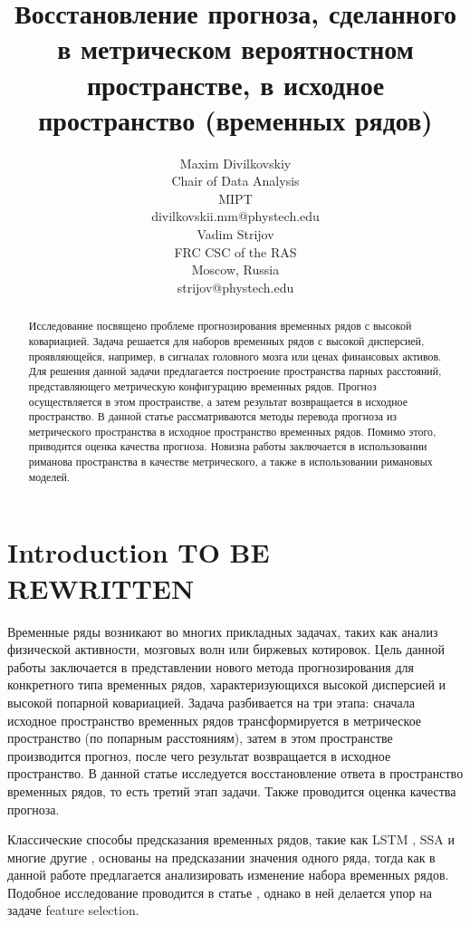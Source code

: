 \documentclass{article}
\title{Восстановление прогноза, сделанного в метрическом вероятностном пространстве, в исходное пространство (временных рядов)}
\author{ Maxim Divilkovskiy \\
	Chair of Data Analysis\\
	MIPT\\
	divilkovskii.mm@phystech.edu \\
	\And
	Vadim Strijov \\
	FRC CSC of the RAS\\
	Moscow, Russia\\
        strijov@phystech.edu \\
}
\date{}
\begin{document}
\maketitle

\begin{abstract}
	Исследование посвящено проблеме прогнозирования временных рядов с высокой ковариацией. Задача решается для наборов временных рядов с высокой дисперсией, проявляющейся, например, в сигналах головного мозга или ценах финансовых активов. Для решения данной задачи предлагается построение пространства парных расстояний, представляющего метрическую конфигурацию временных рядов. Прогноз осуществляется в этом пространстве, а затем результат возвращается в исходное пространство.
	В данной статье рассматриваются методы перевода прогноза из метрического пространства в исходное пространство временных рядов. Помимо этого, приводится оценка качества прогноза. Новизна работы заключается в использовании риманова пространства в качестве метрического, а также в использовании римановых моделей.


\end{abstract}



\section{Introduction TO BE REWRITTEN}
	Временные ряды возникают во многих прикладных задачах, таких как анализ физической активности, мозговых волн или биржевых котировок. Цель данной работы заключается в представлении нового метода прогнозирования для конкретного типа временных рядов, характеризующихся высокой дисперсией и высокой попарной ковариацией. Задача разбивается на три этапа: сначала исходное пространство временных рядов трансформируется в метрическое пространство (по попарным расстояниям), затем в этом пространстве производится прогноз, после чего результат возвращается в исходное пространство. В данной статье исследуется восстановление ответа в пространство временных рядов, то есть третий этап задачи. Также проводится оценка качества прогноза.
		
	Классические способы предсказания временных рядов, такие как LSTM \cite{LSTM}, SSA \cite{SSA} и многие другие \cite{Biosignals}, \cite{boyd2017multiperiod} основаны на предсказании значения одного ряда, тогда как в данной работе предлагается анализировать изменение набора временных рядов. Подобное исследование проводится в статье \cite{MulticorrelatedQuadratic}, однако в ней делается упор на задаче feature selection.
	
\end{document}
